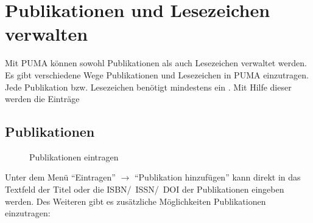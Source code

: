 \section{Publikationen und Lesezeichen verwalten}
\label{sec:publikationen}
 Mit PUMA können sowohl Publikationen als auch Lesezeichen verwaltet werden. Es gibt verschiedene Wege Publikationen und Lesezeichen in PUMA einzutragen. Jede Publikation bzw. Lesezeichen benötigt mindestens ein \tag. Mit Hilfe dieser \tags werden die Einträge 
\subsection{Publikationen}
\begin{figure}[htb]
 \centering
 \caption{Publikationen eintragen}
 \label{fig:publikationenEintragen}
\end{figure}  
Unter dem Menü \enquote{Eintragen} $\to$ \enquote{Publikation hinzufügen} kann direkt in das Textfeld der Titel oder die ISBN/~ISSN/~DOI der Publikationen eingeben werden. Des Weiteren gibt es zusätzliche Möglichkeiten Publikationen einzutragen:
